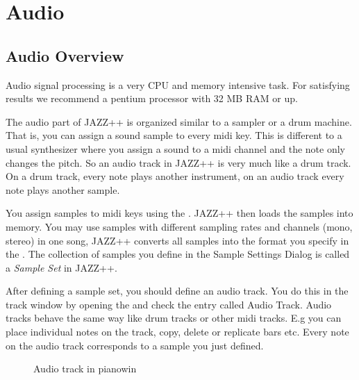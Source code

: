 \documentclass[letterpaper]{report}
\begin{document}

\chapter{Audio}\label{audio}

\section{Audio Overview}\label{audiointro}

Audio signal processing is a very CPU and memory intensive task. For
satisfying results we recommend a pentium processor with 32 MB RAM or
up.

The audio part of JAZZ++ is organized similar to a sampler or a
drum machine. That is, you can assign a sound sample to every midi key.
This is different to a usual synthesizer where you assign a sound
to a midi channel and the note only changes the pitch. So an audio track
in JAZZ++ is very much like a drum track. On a drum track, every
note plays another instrument, on an audio track every note plays
another sample.

You assign samples to midi keys using the . JAZZ++ then loads the samples into memory. You
may use samples with different sampling rates and channels (mono,
stereo) in one song, JAZZ++ converts all samples into the format you
specify in the .
The collection of samples you define in the Sample Settings Dialog
is called a {\em Sample Set} in JAZZ++.

After defining a sample set, you should define an audio track. You do
this in the track window by opening the 
and check the entry called Audio Track. Audio tracks behave the same
way like drum tracks or other midi tracks. E.g you can place individual
notes on the track, copy, delete or replicate bars etc. Every note
on the audio track corresponds to a sample you just defined.

\begin{figure}
\caption{Audio track in pianowin}
\end{figure}
\end{document}

